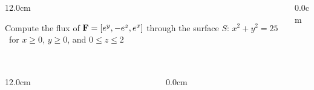 \begin{frame}
\frametitle{}
\scriptsize
\begin{columns}
\begin{column}{12.0cm}

\vspace{4.2cm}

Compute the flux of ${\bf F} = [e^y, -e^z, e^x]$	 through the surface $S:\, x^2 + y^2 = 25$ \, for $x \ge 0$, $y \ge 0$, and $0 \le z \le 2$

\vspace{4.2cm}

\end{column}
\begin{column}{0.0cm}\end{column}
\end{columns}
\end{frame}

\begin{frame}
\frametitle{}
\scriptsize
\begin{columns}
\begin{column}{12.0cm}
	
\end{column}
\begin{column}{0.0cm}\end{column}
\end{columns}
\end{frame}

